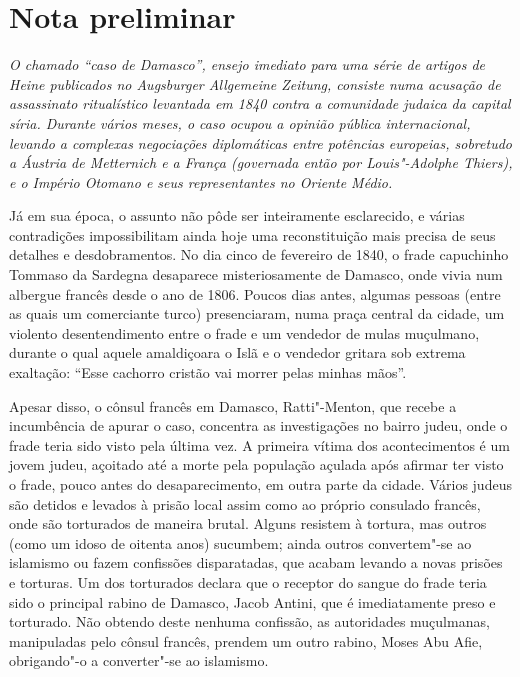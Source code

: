 \chapter{Nota preliminar}


{\itshape
O chamado “caso de Damasco”, ensejo imediato para uma série de artigos
de Heine publicados no \emph{Augsburger Allgemeine Zeitung}, consiste
numa acusação de assassinato ritualístico levantada em 1840 contra a
comunidade judaica da capital síria. Durante vários meses, o caso
ocupou a opinião pública internacional, levando a complexas negociações
diplomáticas entre potências europeias, sobretudo a Áustria de
Metternich e a França (governada então por Louis"-Adolphe Thiers), e o
Império Otomano e seus representantes no Oriente Médio.

Já em sua época, o assunto não pôde ser inteiramente esclarecido, e
várias contradições impossibilitam ainda hoje uma reconstituição mais
precisa de seus detalhes e desdobramentos. No dia cinco de fevereiro de
1840, o frade capuchinho Tommaso da Sardegna desaparece
misteriosamente de Damasco, onde vivia num albergue francês desde o ano
de 1806. Poucos dias antes, algumas pessoas (entre as quais um
comerciante turco) presenciaram, numa praça central da cidade, um
violento desentendimento entre o frade e um vendedor de mulas
muçulmano, durante o qual aquele amaldiçoara o Islã e o vendedor
gritara sob extrema exaltação: “Esse cachorro cristão vai morrer pelas
minhas mãos”.

Apesar disso, o cônsul francês em Damasco, Ratti"-Menton, que recebe a
incumbência de apurar o caso, concentra as investigações no bairro
judeu, onde o frade teria sido visto pela última vez. A primeira vítima
dos acontecimentos é um jovem judeu, açoitado até a morte pela
população açulada após afirmar ter visto o frade, pouco antes do
desaparecimento, em outra parte da cidade. Vários judeus são detidos e
levados à prisão local assim como ao próprio consulado francês, onde
são torturados de maneira brutal. Alguns resistem à tortura, mas outros
(como um idoso de oitenta anos) sucumbem; ainda outros convertem"-se
ao islamismo ou fazem confissões disparatadas, que acabam levando a
novas prisões e torturas. Um dos torturados declara que o receptor do
sangue do frade teria sido o principal rabino de Damasco, Jacob Antini,
que é imediatamente preso e torturado. Não obtendo deste nenhuma
confissão, as autoridades muçulmanas, manipuladas pelo cônsul francês,
prendem um outro rabino, Moses Abu Afie, obrigando"-o a converter"-se
ao islamismo.

}
